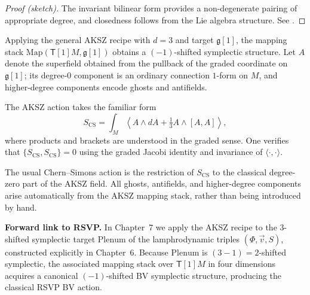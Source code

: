 \begin{proof}[Proof (sketch)]
The invariant bilinear form provides a non-degenerate pairing of appropriate
degree, and closedness follows from the Lie algebra structure. See
\cite{AKSZ97}.
\end{proof}

Applying the general AKSZ recipe with $d=3$ and target $\mathfrak{g}[1]$,
the mapping stack $\mathrm{Map}(\mathsf{T}[1]M,\mathfrak{g}[1])$ obtains
a $(-1)$-shifted symplectic structure.
Let $A$ denote the superfield obtained from the pullback of the graded
coordinate on $\mathfrak{g}[1]$; its degree-$0$ component is an ordinary
connection $1$-form on $M$, and higher-degree components encode ghosts
and antifields.

The AKSZ action takes the familiar form
\begin{equation}
S_{\mathrm{CS}} = \int_M \left\langle A \wedge dA
+ \tfrac13 A \wedge [A,A] \right\rangle,
\end{equation}
where products and brackets are understood in the graded sense.
One verifies that $\{S_{\mathrm{CS}},S_{\mathrm{CS}}\}=0$ using the
graded Jacobi identity and invariance of $\langle\cdot,\cdot\rangle$.

\begin{remark}
The usual Chern--Simons action is the restriction of $S_{\mathrm{CS}}$
to the classical degree-zero part of the AKSZ field.
All ghosts, antifields, and higher-degree components arise automatically
from the AKSZ mapping stack, rather than being introduced by hand.
\end{remark}

\medskip

\noindent\textbf{Forward link to RSVP.}
In Chapter~7 we apply the AKSZ recipe to the
$3$-shifted symplectic target $\mathrm{Plenum}$ of the lamphrodynamic
triples $(\Phi,\vec v,S)$, constructed explicitly in Chapter~6.
Because $\mathrm{Plenum}$ is $(3-1)=2$-shifted symplectic, the associated
mapping stack over $\mathsf{T}[1]M$ in four dimensions acquires a canonical
$(-1)$-shifted BV symplectic structure, producing the classical
RSVP BV action.


